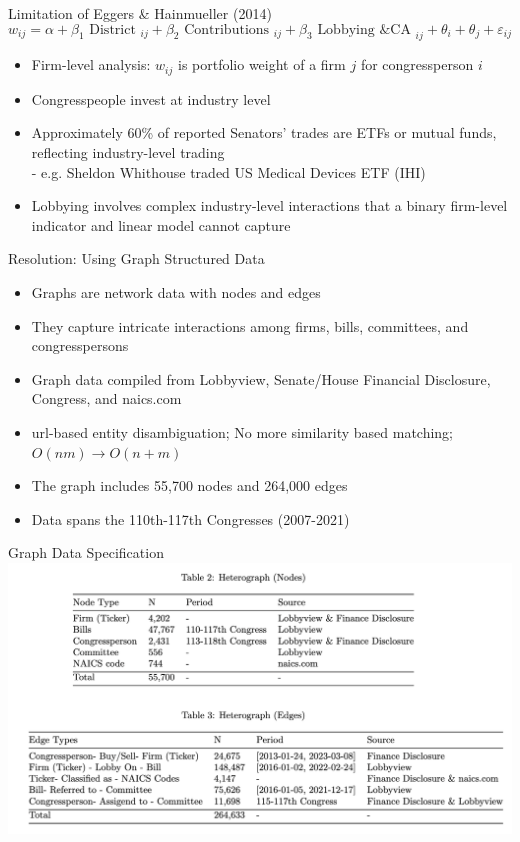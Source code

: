 \documentclass{beamer}
\begin{document}
	\begin{frame}{Limitation of Eggers \& Hainmueller (2014)}
		$$w_{i j}=\alpha+\beta_1 \text { District }_{i j}+\beta_2 \text { Contributions }_{i j}+\beta_3 \text { Lobbying \& CA }_{i j}+\theta_i+\theta_j+\varepsilon_{i j}$$

		\begin{itemize}
			\item Firm-level analysis: $w_{ij}$ is portfolio weight of a firm $j$ for congressperson $i$ 
			\item Congresspeople invest at industry level
			\item Approximately 60\% of reported Senators' trades are ETFs or mutual funds, reflecting industry-level trading \\ 
				- e.g. Sheldon Whithouse traded US Medical Devices ETF (IHI)
			\item Lobbying involves complex industry-level interactions that a binary firm-level indicator and linear model cannot capture
		\end{itemize}
	\end{frame}

	\begin{frame}{Resolution: Using Graph Structured Data}
		\begin{itemize}
\item			Graphs are network data with nodes and edges
	\item		They capture intricate interactions among firms, bills, committees, and congresspersons
			\item Graph data compiled from Lobbyview, Senate/House Financial Disclosure, Congress, and naics.com
			\item url-based entity disambiguation; No more similarity based matching; $O(nm) \rightarrow O(n+m)$
		\item	The graph includes 55,700 nodes and 264,000 edges
			\item Data spans the 110th-117th Congresses (2007-2021)
		\end{itemize}
	\end{frame}

	\begin{frame}{Graph Data Specification}
		\centering	\includegraphics[scale=0.4]{./images/spec.png}

	\end{frame}
\end{document}
